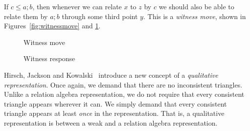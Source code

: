 \documentclass[12pt]{article}
\theoremstyle{definition}
\newcommand{\comp}{\mathbin{;}}%
\begin{document}
  If $c \le a \comp b$, then whenever we can relate $x$ to $z$ by $c$ we should also be able to relate them by $a \comp b$ through some third point $y$. This is a \emph{witness move}, shown in Figures~\ref{fig:witnessmove} and \ref{fig:witnessresponse}.

\begin{figure}[ht]
\noindent\begin{minipage}{0.45\textwidth}
\centering
{}
\caption{Witness move}\label{fig:witnessmove}
\end{minipage}\hfill
\begin{minipage}{0.45\textwidth}
\centering
{}
\caption{Witness response}\label{fig:witnessresponse}
\end{minipage}
\end{figure}

Hirsch, Jackson and Kowalski~\cite{HirschJacksonKowalski2016} introduce a new concept of a \emph{qualitative representation}. Once again, we demand that there are no inconsistent triangles. Unlike a relation algebra representation, we do not require that every consistent triangle appears wherever it can. We simply demand that every consistent triangle appears at least \emph{once} in the representation. That is, a qualitative representation is between a weak and a relation algebra representation.
\end{document}
